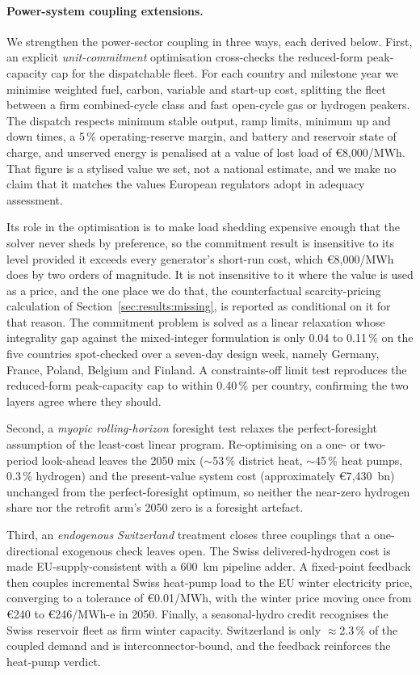 \paragraph{Power-system coupling extensions.} We strengthen the power-sector coupling in
three ways, each derived below. First, an explicit \emph{unit-commitment} optimisation
cross-checks the reduced-form peak-capacity cap for the dispatchable fleet. For each
country and milestone year we minimise weighted fuel, carbon, variable and start-up
cost, splitting the fleet between a firm combined-cycle class and fast open-cycle gas or
hydrogen peakers. The dispatch respects minimum stable output, ramp limits, minimum up
and down times, a 5\,\% operating-reserve margin, and battery and reservoir state of
charge, and unserved energy is penalised at a value of lost load of \euro{}8{,}000/MWh.
That figure is a stylised value we set, not a national estimate, and we make no claim
that it matches the values European regulators adopt in adequacy assessment.

Its role in the optimisation is to make load shedding expensive enough that the solver
never sheds by preference, so the commitment result is insensitive to its level provided
it exceeds every generator's short-run cost, which \euro{}8{,}000/MWh does by two orders
of magnitude. It is not insensitive to it where the value is used as a price, and the
one place we do that, the counterfactual scarcity-pricing calculation of
Section~\ref{sec:results:missing}, is reported as conditional on it for that reason. The
commitment problem is solved as a linear relaxation whose integrality gap against the
mixed-integer formulation is only 0.04 to 0.11\,\% on the five countries spot-checked
over a seven-day design week, namely Germany, France, Poland, Belgium and Finland. A
constraints-off limit test reproduces the reduced-form peak-capacity cap to within
0.40\,\% per country, confirming the two layers agree where they should.

Second, a \emph{myopic rolling-horizon} foresight test relaxes the perfect-foresight assumption of the
least-cost linear program. Re-optimising on a one- or two-period look-ahead leaves the
2050 mix ($\sim$53\,\% district heat, $\sim$45\,\% heat pumps, 0.3\,\% hydrogen) and
the present-value system cost (approximately \euro{}7{,}430~bn) unchanged from the
perfect-foresight optimum, so neither the near-zero hydrogen share nor the retrofit
arm's 2050 zero is a foresight artefact.

Third, an \emph{endogenous Switzerland} treatment closes three
couplings that a one-directional exogenous check leaves open. The Swiss delivered-hydrogen
cost is made EU-supply-consistent with a 600~km pipeline adder. A fixed-point feedback
then couples incremental Swiss heat-pump load to the EU winter electricity price,
converging to a tolerance of \euro{}0.01/MWh, with the winter price moving once from
\euro{}240 to \euro{}246/MWh-e in 2050. Finally, a seasonal-hydro credit recognises the
Swiss reservoir fleet as firm winter capacity. Switzerland is only
$\approx$2.3\,\% of the coupled demand and is interconnector-bound, and the feedback
reinforces the heat-pump verdict.

